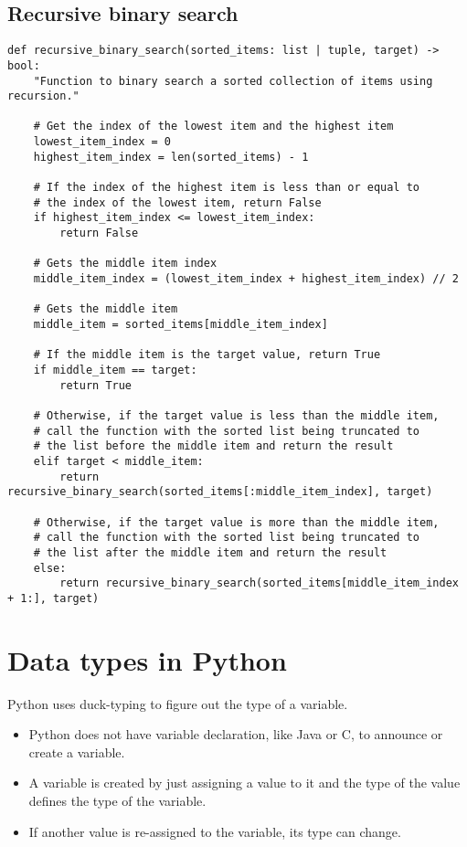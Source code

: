 \documentclass[11pt]{article}
\begin{document}
\subsection{Recursive binary search}
\label{sec:orgaa70733}
\begin{verbatim}
def recursive_binary_search(sorted_items: list | tuple, target) -> bool:
    "Function to binary search a sorted collection of items using recursion."

    # Get the index of the lowest item and the highest item
    lowest_item_index = 0
    highest_item_index = len(sorted_items) - 1

    # If the index of the highest item is less than or equal to
    # the index of the lowest item, return False
    if highest_item_index <= lowest_item_index:
        return False

    # Gets the middle item index
    middle_item_index = (lowest_item_index + highest_item_index) // 2

    # Gets the middle item
    middle_item = sorted_items[middle_item_index]

    # If the middle item is the target value, return True
    if middle_item == target:
        return True

    # Otherwise, if the target value is less than the middle item,
    # call the function with the sorted list being truncated to
    # the list before the middle item and return the result
    elif target < middle_item:
        return recursive_binary_search(sorted_items[:middle_item_index], target)

    # Otherwise, if the target value is more than the middle item,
    # call the function with the sorted list being truncated to
    # the list after the middle item and return the result
    else:
        return recursive_binary_search(sorted_items[middle_item_index + 1:], target)
\end{verbatim}

 \newpage
\section{Data types in Python}
\label{sec:org0451aac}
Python uses duck-typing to figure out the type of a variable.
\begin{itemize}
\item Python does not have variable declaration, like Java or C, to announce or create a variable.
\item A variable is created by just assigning a value to it and the type of the value defines the type of the variable.
\item If another value is re-assigned to the variable, its type can change.
\end{itemize}
\end{document}
